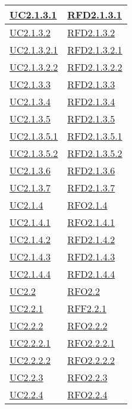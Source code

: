 \begin{longtable}{|>{\centering}m{5cm}|m{5cm}<{\centering}|}
\hyperref[UC2.1.3.1]{UC2.1.3.1} & \hyperlink{RFD2.1.3.1}{RFD2.1.3.1}\\ \hline
\hyperref[UC2.1.3.2]{UC2.1.3.2} & \hyperlink{RFD2.1.3.2}{RFD2.1.3.2}\\ \hline
\hyperref[UC2.1.3.2.1]{UC2.1.3.2.1} & \hyperlink{RFD2.1.3.2.1}{RFD2.1.3.2.1}\\ \hline
\hyperref[UC2.1.3.2.2]{UC2.1.3.2.2} & \hyperlink{RFD2.1.3.2.2}{RFD2.1.3.2.2}\\ \hline
\hyperref[UC2.1.3.3]{UC2.1.3.3} & \hyperlink{RFD2.1.3.3}{RFD2.1.3.3}\\ \hline
\hyperref[UC2.1.3.4]{UC2.1.3.4} & \hyperlink{RFD2.1.3.4}{RFD2.1.3.4}\\ \hline
\hyperref[UC2.1.3.5]{UC2.1.3.5} & \hyperlink{RFD2.1.3.5}{RFD2.1.3.5}\\ \hline
\hyperref[UC2.1.3.5.1]{UC2.1.3.5.1} & \hyperlink{RFD2.1.3.5.1}{RFD2.1.3.5.1}\\ \hline
\hyperref[UC2.1.3.5.2]{UC2.1.3.5.2} & \hyperlink{RFD2.1.3.5.2}{RFD2.1.3.5.2}\\ \hline
\hyperref[UC2.1.3.6]{UC2.1.3.6} & \hyperlink{RFD2.1.3.6}{RFD2.1.3.6}\\ \hline
\hyperref[UC2.1.3.7]{UC2.1.3.7} & \hyperlink{RFD2.1.3.7}{RFD2.1.3.7}\\ \hline
\hyperref[UC2.1.4]{UC2.1.4} & \hyperlink{RFO2.1.4}{RFO2.1.4}\\ \hline
\hyperref[UC2.1.4.1]{UC2.1.4.1} & \hyperlink{RFO2.1.4.1}{RFO2.1.4.1}\\ \hline
\hyperref[UC2.1.4.2]{UC2.1.4.2} & \hyperlink{RFD2.1.4.2}{RFD2.1.4.2}\\ \hline
\hyperref[UC2.1.4.3]{UC2.1.4.3} & \hyperlink{RFD2.1.4.3}{RFD2.1.4.3}\\ \hline
\hyperref[UC2.1.4.4]{UC2.1.4.4} & \hyperlink{RFD2.1.4.4}{RFD2.1.4.4}\\ \hline
\hyperref[UC2.2]{UC2.2} & \hyperlink{RFO2.2}{RFO2.2}\\ \hline
\hyperref[UC2.2.1]{UC2.2.1} & \hyperlink{RFF2.2.1}{RFF2.2.1}\\ \hline
\hyperref[UC2.2.2]{UC2.2.2} & \hyperlink{RFO2.2.2}{RFO2.2.2}\\ \hline
\hyperref[UC2.2.2.1]{UC2.2.2.1} & \hyperlink{RFO2.2.2.1}{RFO2.2.2.1}\\ \hline
\hyperref[UC2.2.2.2]{UC2.2.2.2} & \hyperlink{RFO2.2.2.2}{RFO2.2.2.2}\\ \hline
\hyperref[UC2.2.3]{UC2.2.3} & \hyperlink{RFO2.2.3}{RFO2.2.3}\\ \hline
\hyperref[UC2.2.4]{UC2.2.4} & \hyperlink{RFO2.2.4}{RFO2.2.4}\\ \hline

\end{longtable}
